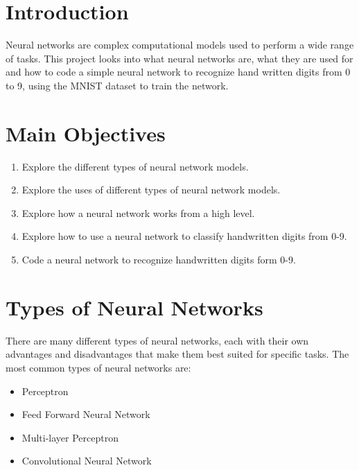\documentclass[a1,portrait]{a1poster}
\begin{document}
\begin{multicols}{2}
\color{Black} %

\section*{Introduction}
Neural networks are complex computational models used to perform a wide range of tasks. This project looks into what neural networks are, what they are used for and how to code a simple neural network to recognize hand written digits from 0 to 9, using the MNIST dataset to train the network.


\color{Black} %

\section*{Main Objectives}

\begin{enumerate}
\item Explore the different types of neural network models.
\item Explore the uses of different types of neural network models.
\item Explore how a neural network works from a high level.
\item Explore how to use a neural network to classify handwritten digits from 0-9.
\item Code a neural network to recognize handwritten digits form 0-9.
\end{enumerate}



\section*{Types of Neural Networks}
There are many different types of neural networks, each with their own advantages and disadvantages that make them best suited for specific tasks. The most common types of neural networks are:
\begin{itemize}
    \item Perceptron
    \item Feed Forward Neural Network
    \item Multi-layer Perceptron
    \item Convolutional Neural Network
\end{itemize}


\end{multicols}
\end{document}
